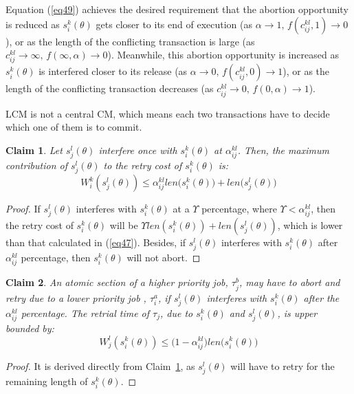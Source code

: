 \documentclass[conference]{IEEEtran}
\newtheorem{clm}{Claim}
\begin{document}
Equation (\ref{eq49}) achieves the desired requirement that the abortion opportunity is reduced as $s_{i}^{k}(\theta)$ gets
closer to its end of execution (as $\alpha\rightarrow1,\, f(c_{ij}^{kl},1)\rightarrow0$),
or as the length of the conflicting transaction is large (as $c_{ij}^{kl}\rightarrow\infty,\, f(\infty,\alpha)\rightarrow0$).
Meanwhile, this abortion opportunity is increased as $s_{i}^{k}(\theta)$
is interfered closer to its release (as $\alpha\rightarrow0,\, f(c_{ij}^{kl},0)\rightarrow1$),
or as the length of the conflicting transaction decreases (as $c_{ij}^{kl}\rightarrow0,\, f(0,\alpha)\rightarrow1$).

LCM is not a central CM, which means each two transactions have to decide which one of them is to commit.

\begin{clm}
\label{LCM_higher_rc}
Let $s_{j}^{l}(\theta)$ interfere once with $s_{i}^{k}(\theta)$ at $\alpha_{ij}^{kl}$. Then, the maximum contribution of $s_{j}^{l}(\theta)$ to the retry cost of $s_{i}^{k}(\theta)$ is:
\begin{equation}
W_i^k(s_j^l(\theta))\le \alpha_{ij}^{kl}len\Big(s_{i}^{k}(\theta)\Big)+len\Big(s_{j}^{l}(\theta)\Big)\label{eq47}\end{equation}
\end{clm}
\begin{proof}
If $s_{j}^{l}(\theta)$ interferes with $s_{i}^{k}(\theta)$
at a $\Upsilon$ percentage, where $\Upsilon<\alpha_{ij}^{kl}$,
then the retry cost of $s_{i}^{k}(\theta)$ will be $\Upsilon len(s_{i}^{k}(\theta))+len(s_{j}^{l}(\theta))$, which is lower than that calculated in (\ref{eq47}). Besides, 
if $s_{j}^{l}(\theta)$ interferes with $s_{i}^{k}(\theta)$ after
$\alpha_{ij}^{kl}$ percentage, then $s_{i}^{k}(\theta)$ will not
abort.
\end{proof}

\begin{clm}
\label{LCM_lower_rc}
An atomic section of a higher priority job, $\tau_{j}^b$, may have to abort and retry due to a lower priority job	, $\tau_{i}^a$, if $s_{j}^{l}(\theta)$ interferes
with $s_{i}^{k}(\theta)$ after the $\alpha_{ij}^{kl}$ percentage.
The retrial time of $\tau_{j}$, due to $s_{i}^{k}(\theta)$ and $s_{j}^{l}(\theta)$,
is upper bounded by:
 \begin{equation}
W_j^l(s_i^k(\theta))\le \Big(1-\alpha_{ij}^{kl}\Big)len\Big(s_{i}^{k}(\theta)\Big)\label{eq48}\end{equation}
\end{clm}
\begin{proof}
It is derived directly from Claim~\ref{LCM_higher_rc}, as $s_j^l(\theta)$ will have to retry for the remaining length of $s_i^k(\theta)$.
\end{proof}
\end{document}
